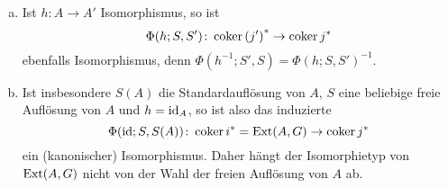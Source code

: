 \begin{kommentar}
  \begin{enumerate}[(a)]
    \item
      Ist $h\colon A \to A'$ Isomorphismus, so ist
      \begin{equation*}
        \Phi(h;S,S')\colon \operatorname{coker} {(j')}^* \to \operatorname{coker} j^*
      \end{equation*}
      ebenfalls Isomorphismus, denn $\Phi(h^{-1};S',S) = {\Phi(h;S,S')}^{-1}$.
    \item
      Ist insbesondere $S(A)$ die Standardauflösung von $A$, $S$ eine beliebige freie Auflösung von $A$ und $h = \operatorname{id}_A$, so ist also das induzierte
      \begin{equation*}
        \Phi(\operatorname{id};S,S(A))\colon \operatorname{coker} i^* = \mathrm{Ext}(A,G) \to \operatorname{coker} j^*
      \end{equation*}
      ein (kanonischer) Isomorphismus.
      Daher hängt der Isomorphietyp von $\mathrm{Ext}(A,G)$ nicht von der Wahl der freien Auflösung von $A$ ab.
  \end{enumerate}
\end{kommentar}
